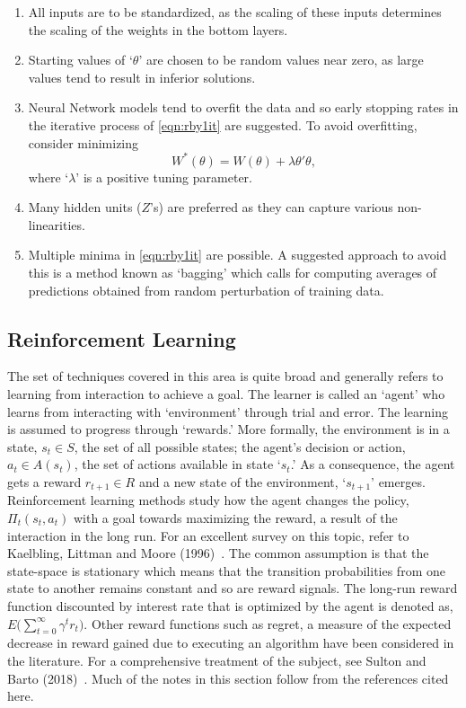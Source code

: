 \begin{enumerate}[--]
\item All inputs are to be standardized, as the scaling of these inputs determines the scaling of the weights in the bottom layers.
\item Starting values of `$\theta$' are chosen to be random values near zero, as large values tend to result in inferior solutions.
\item Neural Network models tend to overfit the data and so early stopping rates in the iterative process of \eqref{eqn:rby1it} are suggested. To avoid overfitting, consider minimizing 
	\begin{equation}\label{eqn:overfit}
	W^*(\theta)= W(\theta) + \lambda \theta' \theta,
	\end{equation}
where `$\lambda$' is a positive tuning parameter.
\item Many hidden units ($Z$'s) are preferred as they can capture various non-linearities. 
\item Multiple minima in \eqref{eqn:rby1it} are possible. A suggested approach to avoid this is a method known as `bagging' which calls for computing averages of predictions obtained from random perturbation of training data. \\
\end{enumerate}


\subsection{Reinforcement Learning}

The set of techniques covered in this area is quite broad and generally refers to learning from interaction to achieve a goal. The learner is called an `agent' who learns from interacting with `environment' through trial and error. The learning is assumed to progress through `rewards.' More formally, the environment is in a state, $s_t \in S$, the set of all possible states; the agent's decision or action, $a_t \in A(s_t)$, the set of actions available in state `$s_t$.' As a consequence, the agent gets a reward $r_{t+1} \in R$ and a new state of the environment, `$s_{t+1}$' emerges. Reinforcement learning methods study how the agent changes the policy, $\Pi_t (s_t,a_t)$ with a goal towards maximizing the reward, a result of the interaction in the long run. For an excellent survey on this topic, refer to Kaelbling, Littman and Moore (1996)~\cite{littmanmoor}. The common assumption is that the state-space is stationary which means that the transition probabilities from one state to another remains constant and so are reward signals. The long-run reward function discounted by interest rate that is optimized by the agent is denoted as, $E\big( \sum_{t=0}^\infty \gamma^t r_t \big)$. Other reward functions such as regret, a measure of the expected decrease in reward gained due to executing an algorithm have been considered in the literature. For a comprehensive treatment of the subject, see Sulton and Barto (2018)~\cite{sultonbarto}. Much of the notes in this section follow from the references cited here. \twomedskip


